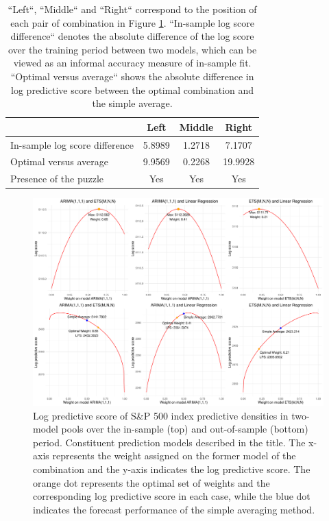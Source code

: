 \documentclass{monashthesis}
\begin{document}
\begin{table}[ht]
  \centering
    \begin{tabular}{l|ccc}
    \toprule
                                      &    Left     &   Middle    &    Right   \\
    \midrule
    In-sample log score difference    &   5.8989    &   1.2718    &   7.1707   \\
    Optimal versus average            &   9.9569    &   0.2268    &  19.9928   \\
    Presence of the puzzle            &   Yes       &   Yes       &   Yes      \\
    \bottomrule
    \end{tabular}
  \caption{``Left``, ``Middle`` and ``Right`` correspond to the position of each pair of combination in Figure \ref{fig:nonstat}. ``In-sample log score difference`` denotes the absolute difference of the log score over the training period between two models, which can be viewed as an informal accuracy measure of in-sample fit. ``Optimal versus average`` shows the absolute difference in log predictive score between the optimal combination and the simple average.}
  \label{tab:comparison1}
\end{table}

\begin{figure}[ht]
\centering
\includegraphics[scale=0.45]{figures/SP500_nonstationary.pdf}
\caption{Log predictive score of S\&P 500 index predictive densities in two-model pools over the in-sample (top) and out-of-sample (bottom) period. Constituent prediction models described in the title. The x-axis represents the weight assigned on the former model of the combination and the y-axis indicates the log predictive score. The orange dot represents the optimal set of weights and the corresponding log predictive score in each case, while the blue dot indicates the forecast performance of the simple averaging method.}
\label{fig:nonstat}
\end{figure}
\end{document}
